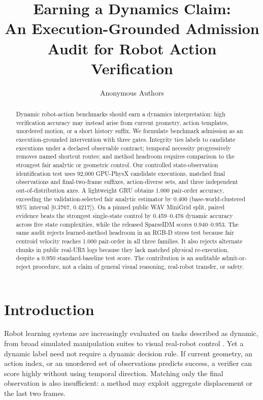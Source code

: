 \documentclass[letterpaper,10pt,conference]{ieeeconf}
\title{Earning a Dynamics Claim:\\
An Execution-Grounded Admission Audit for Robot Action Verification}
\author{Anonymous Authors}
\begin{document}
\maketitle
\thispagestyle{empty}
\pagestyle{empty}

\begin{abstract}
Dynamic robot-action benchmarks should earn a dynamics interpretation: high
verification accuracy may instead arise from current geometry, action
templates, unordered motion, or a short history suffix. We formulate
benchmark admission as an execution-grounded intervention with three gates.
Integrity ties labels to candidate executions under a declared observable
contract; temporal necessity progressively removes named shortcut routes; and
method headroom requires comparison to the strongest fair analytic or
geometric control. Our controlled state-observation identification test uses 92,000
GPU-PhysX candidate executions,
matched final observations and final-two-frame suffixes, action-diverse sets,
and three independent out-of-distribution axes. A lightweight GRU obtains
1.000 pair-order accuracy, exceeding the validation-selected fair analytic
estimator by 0.400 (base-world-clustered 95\% interval [0.3767, 0.4217]). On a
pinned public WAV MiniGrid split, paired evidence beats the strongest
single-state control by 0.459--0.476 dynamic accuracy across five state
complexities, while the released SparseIDM scores 0.940--0.953. The same audit
rejects learned-method headroom in an RGB-D stress test because fair centroid
velocity reaches 1.000 pair-order in all three families. It also rejects
alternate chunks in public real-UR5 logs because they lack matched physical
re-execution, despite a 0.950 standard-baseline test score. The contribution is
an auditable admit-or-reject procedure, not a claim of general visual
reasoning, real-robot transfer, or safety.
\end{abstract}

\section{Introduction}

Robot learning systems are increasingly evaluated on tasks described as
dynamic, from broad simulated manipulation suites to visual real-robot control
\cite{james2019rlbench,brohan2022rt1,nasiriany2024robocasa}. Yet a dynamic
label need not require a dynamic decision rule. If current geometry, an action
index, or an unordered set of observations predicts success, a verifier can
score highly without using temporal direction. Matching only the final
observation is also insufficient: a method may exploit aggregate displacement
or the last two frames.
\end{document}
